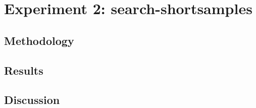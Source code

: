\section{Experiment 2: \textbf{search-shortsamples}}

\subsection{Methodology}

\subsection{Results}


\subsection{Discussion}